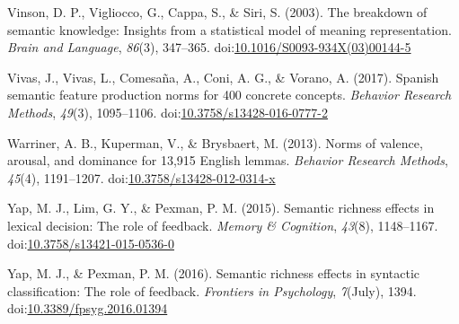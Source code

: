 \documentclass[english,,man]{apa6}
\theoremstyle{definition}
\theoremstyle{definition}
\theoremstyle{definition}
\theoremstyle{remark}
\begin{document}
\leavevmode\hypertarget{ref-Vinson2003}{}%
Vinson, D. P., Vigliocco, G., Cappa, S., \& Siri, S. (2003). The
breakdown of semantic knowledge: Insights from a statistical model of
meaning representation. \emph{Brain and Language}, \emph{86}(3),
347--365.
doi:\href{https://doi.org/10.1016/S0093-934X(03)00144-5}{10.1016/S0093-934X(03)00144-5}

\leavevmode\hypertarget{ref-Vivas2017}{}%
Vivas, J., Vivas, L., Comesaña, A., Coni, A. G., \& Vorano, A. (2017).
Spanish semantic feature production norms for 400 concrete concepts.
\emph{Behavior Research Methods}, \emph{49}(3), 1095--1106.
doi:\href{https://doi.org/10.3758/s13428-016-0777-2}{10.3758/s13428-016-0777-2}

\leavevmode\hypertarget{ref-Warriner2013}{}%
Warriner, A. B., Kuperman, V., \& Brysbaert, M. (2013). Norms of
valence, arousal, and dominance for 13,915 English lemmas.
\emph{Behavior Research Methods}, \emph{45}(4), 1191--1207.
doi:\href{https://doi.org/10.3758/s13428-012-0314-x}{10.3758/s13428-012-0314-x}

\leavevmode\hypertarget{ref-Yap2015}{}%
Yap, M. J., Lim, G. Y., \& Pexman, P. M. (2015). Semantic richness
effects in lexical decision: The role of feedback. \emph{Memory \&
Cognition}, \emph{43}(8), 1148--1167.
doi:\href{https://doi.org/10.3758/s13421-015-0536-0}{10.3758/s13421-015-0536-0}

\leavevmode\hypertarget{ref-Yap2016}{}%
Yap, M. J., \& Pexman, P. M. (2016). Semantic richness effects in
syntactic classification: The role of feedback. \emph{Frontiers in
Psychology}, \emph{7}(July), 1394.
doi:\href{https://doi.org/10.3389/fpsyg.2016.01394}{10.3389/fpsyg.2016.01394}
\end{document}
